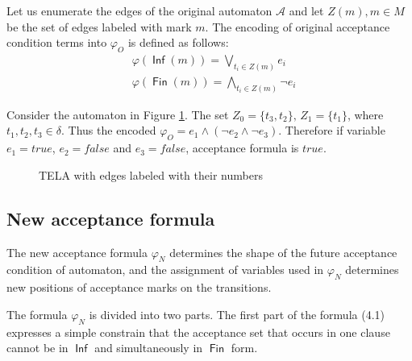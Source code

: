 \documentclass[a4paper,UKenglish,cleveref, autoref, thm-restate]{lipics-v2021}
\DeclareMathOperator{\Inf}{\mathsf{Inf}}
\DeclareMathOperator{\Fin}{\mathsf{Fin}}
\def\false{\mathit{false}}
\def\true{\mathit{true}}
\begin{document}
Let us enumerate the edges of the original automaton $\mathcal{A}$ and let $Z(m), m \in M$ be the set of edges labeled with mark $m$. 
The encoding of original acceptance condition terms into $\varphi_{O}$ is defined as follows:
\begin{align*}
    &\varphi(\Inf(m))=\bigvee\limits_{t_{i} \in Z(m)} e_{i}\\
    &\varphi(\Fin(m)) = \bigwedge\limits_{t_{i} \in Z(m)} \lnot e_{i}
\end{align*}
\begin{example}

Consider the automaton in Figure \ref{fig:oficial_acc}. The set $Z_{0} = \{t_3, t_2\},\, Z_{1} = \{t_1\}$, where $t_{1}, t_{2}, t_{3} \in \delta$. Thus the encoded $\varphi_{O} = e_1 \land (\lnot e_2 \land \lnot e_3)$. Therefore if variable $e_{1}=\true$, $e_{2}=\false$ and $e_{3}=\false$, acceptance formula is $\true$.
\begin{figure}[h]
    \centering
    \caption{TELA with edges labeled with their numbers}
    \label{fig:oficial_acc}
\end{figure}

\end{example}

\subsection{New acceptance formula}
\label{subsection:new}
The new acceptance formula $\varphi_{N}$ determines the shape of the future acceptance condition of automaton, and the assignment of variables used in $\varphi_{N}$ determines new positions of acceptance marks on the transitions.

The formula $\varphi_{N}$ is divided into two parts.
The first part of the formula (4.1) expresses a simple constrain that the acceptance set that occurs in one clause cannot be in $\Inf$ and simultaneously in $\Fin$ form.
\end{document}
